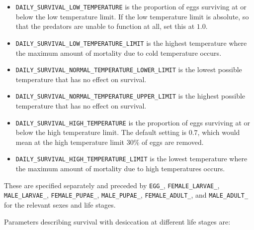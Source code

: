 \documentclass[11pt]{article}
\newcommand{\linecmd}[1]{\texttt{#1}}
\begin{document}
\begin{itemize}
	\item \linecmd{DAILY\_SURVIVAL\_LOW\_TEMPERATURE} is the proportion of eggs surviving at or below the low temperature limit. If the low temperature limit is absolute, so that the predators are unable to function at all, set this at $1.0$.
	\item \linecmd{DAILY\_SURVIVAL\_LOW\_TEMPERATURE\_LIMIT} is the highest temperature where the maximum amount of mortality due to cold temperature occurs.
	\item \linecmd{DAILY\_SURVIVAL\_NORMAL\_TEMPERATURE\_LOWER\_LIMIT} is the lowest possible temperature that has no effect on survival.
	\item \linecmd{DAILY\_SURVIVAL\_NORMAL\_TEMPERATURE\_UPPER\_LIMIT} is the highest possible temperature that has no effect on survival.
	\item \linecmd{DAILY\_SURVIVAL\_HIGH\_TEMPERATURE} is the proportion of eggs surviving at or below the high temperature limit. The default setting is $0.7$, which would mean at the high temperature limit $30\%$ of eggs are removed. 
	\item \linecmd{DAILY\_SURVIVAL\_HIGH\_TEMPERATURE\_LIMIT} is the lowest temperature where the maximum amount of mortality due to high temperatures occurs.
\end{itemize}

These are specified separately and preceded by \linecmd{EGG\_}, \linecmd{FEMALE\_LARVAE\_}, \linecmd{MALE\_LARVAE\_}, \linecmd{FEMALE\_PUPAE\_}, \linecmd{MALE\_PUPAE\_}, \linecmd{FEMALE\_ADULT\_}, and \linecmd{MALE\_ADULT\_} for the relevant sexes and life stages.

Parameters describing survival with desiccation at different life stages are:
\end{document}

